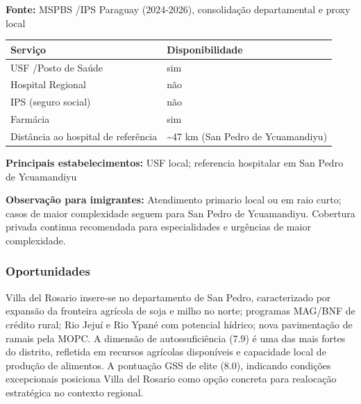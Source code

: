 \textbf{Fonte:} MSPBS /\allowbreak  IPS Paraguay (2024-2026), consolidação
departamental e proxy local

{\def\LTcaptype{none} %
\begin{longtable}[]{@{}
  >{\raggedright\arraybackslash}p{}
  >{\raggedright\arraybackslash}p{}@{}}
\toprule\noalign{}
\begin{minipage}[b]{\linewidth}\raggedright
Serviço
\end{minipage} & \begin{minipage}[b]{\linewidth}\raggedright
Disponibilidade
\end{minipage} \\
\midrule\noalign{}
\endhead
\bottomrule\noalign{}
\endlastfoot
USF /\allowbreak  Posto de Saúde & sim \\
Hospital Regional & não \\
IPS (seguro social) & não \\
Farmácia & sim \\
Distância ao hospital de referência & \textasciitilde47 km (San Pedro de
Ycuamandiyu) \\
\end{longtable}
}

\textbf{Principais estabelecimentos:} USF local; referencia hospitalar
em San Pedro de Ycuamandiyu

\textbf{Observação para imigrantes:} Atendimento primario local ou em
raio curto; casos de maior complexidade seguem para San Pedro de
Ycuamandiyu. Cobertura privada continua recomendada para especialidades
e urgências de maior complexidade.
\newpage

\subsubsection*{Oportunidades}\label{oport-villa-del-rosario-0213}
Villa del Rosario insere-se no departamento de San Pedro, caracterizado por expansão da fronteira agrícola de soja e milho no norte; programas MAG/BNF de crédito rural; Rio Jejuí e Rio Ypané com potencial hídrico; nova pavimentação de ramais pela MOPC. A dimensão de autossuficiência (7.9) é uma das mais fortes do distrito, refletida em recursos agrícolas disponíveis e capacidade local de produção de alimentos. A pontuação GSS de elite (8.0), indicando condições excepcionais posiciona Villa del Rosario como opção concreta para realocação estratégica no contexto regional.

